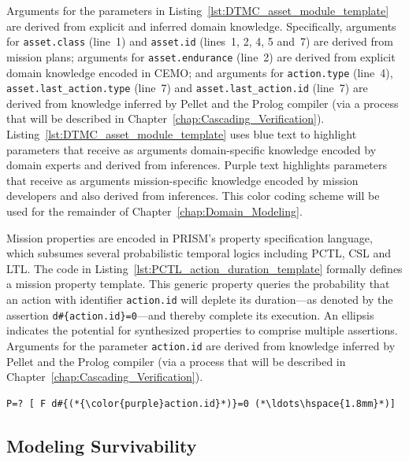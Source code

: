 Arguments for the parameters in Listing~\ref{lst:DTMC_asset_module_template} are derived from explicit and inferred domain knowledge. Specifically, arguments for \texttt{asset.class} (line~1) and \texttt{asset.id} (lines~1, 2, 4, 5 and~7) are derived from mission plans; arguments for \texttt{asset.endurance} (line~2) are derived from explicit domain knowledge encoded in CEMO; and arguments for \texttt{action.type} (line~4), \texttt{asset.last\_action.type} (line~7) and \texttt{asset.last\_action.id} (line~7) are derived from knowledge inferred by Pellet and the Prolog compiler (via a process that will be described in Chapter~\ref{chap:Cascading_Verification}). Listing~\ref{lst:DTMC_asset_module_template} uses blue text to highlight parameters that receive as arguments domain-specific knowledge encoded by domain experts and derived from inferences. Purple text highlights parameters that receive as arguments mission-specific knowledge encoded by mission developers and also derived from inferences. This color coding scheme will be used for the remainder of Chapter~\ref{chap:Domain_Modeling}.

Mission properties are encoded in PRISM's property specification language, which subsumes several probabilistic temporal logics including PCTL, CSL and LTL\@. The code in Listing~\ref{lst:PCTL_action_duration_template} formally defines a mission property template. This generic property queries the probability that an action with identifier \texttt{action.id} will deplete its duration---as denoted by the assertion \texttt{d\#\{action.id\}=0}---and thereby complete its execution. An ellipsis indicates the potential for synthesized properties to comprise multiple assertions. Arguments for the parameter \texttt{action.id} are derived from knowledge inferred by Pellet and the Prolog compiler (via a process that will be described in Chapter~\ref{chap:Cascading_Verification}).

\begin{lstlisting}[caption={PCTL template for action duration},label=lst:PCTL_action_duration_template]
P=? [ F d#{(*{\color{purple}action.id}*)}=0 (*\ldots\hspace{1.8mm}*)]
\end{lstlisting}

\subsection{Modeling Survivability}
\label{sec:Modeling_Survivability}

